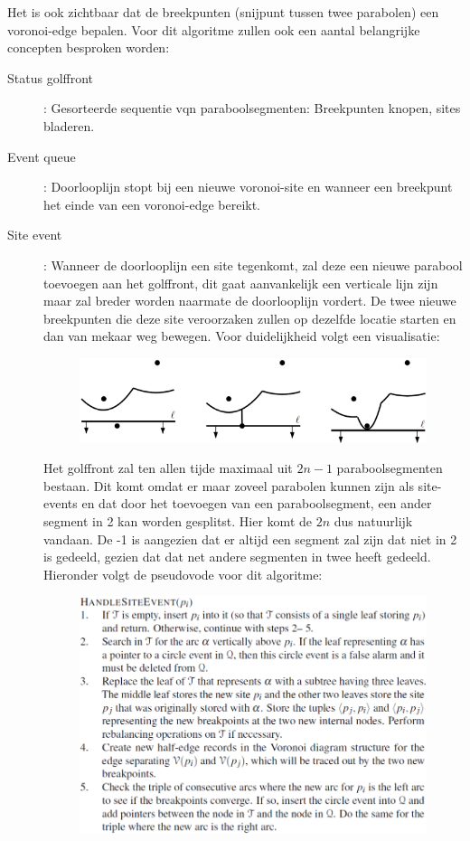 \documentclass[12pt,a4paper]{article}
\begin{document}
	Het is ook zichtbaar dat de breekpunten (snijpunt tussen twee parabolen) een voronoi-edge bepalen. Voor dit algoritme zullen ook een aantal belangrijke concepten besproken worden: 
	
	\begin{description}
		\item[Status golffront]: Gesorteerde sequentie vqn paraboolsegmenten: Breekpunten knopen, sites bladeren. 
		\item[Event queue]: Doorlooplijn stopt bij een nieuwe voronoi-site en wanneer een breekpunt het einde van een voronoi-edge bereikt. 
		\item[Site event]: Wanneer de doorlooplijn een site tegenkomt, zal deze een nieuwe parabool toevoegen aan het golffront, dit gaat aanvankelijk een verticale lijn zijn maar zal breder worden naarmate de doorlooplijn vordert. De twee nieuwe breekpunten die deze site veroorzaken zullen op dezelfde locatie starten en dan van mekaar weg bewegen. Voor duidelijkheid volgt een visualisatie: 
		\begin{figure}[H]
			\centering
			\includegraphics[width=0.7\linewidth]{afbeeldingen/voronoi/site-event}
			\label{fig:site-event}
		\end{figure}
	
		Het golffront zal ten allen tijde maximaal uit $2n-1$ paraboolsegmenten bestaan. Dit komt omdat er maar zoveel parabolen kunnen zijn als site-events en dat door het toevoegen van een paraboolsegment, een ander segment in 2 kan worden gesplitst. Hier komt de $2n$ dus natuurlijk vandaan. De -1 is aangezien dat er altijd een segment zal zijn dat niet in 2 is gedeeld, gezien dat dat net andere segmenten in twee heeft gedeeld. Hieronder volgt de pseudovode voor dit algoritme: 
		\begin{figure}[H]
			\centering
			\includegraphics[width=0.8\linewidth]{afbeeldingen/voronoi/handleSiteEvent}
			\label{fig:handlesiteevent}
		\end{figure}
		

\end{description}
\end{document}
